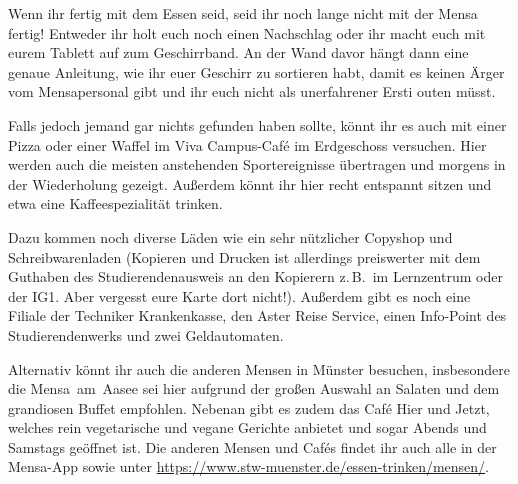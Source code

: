 \begin{multicols}{2}
Wenn ihr fertig mit dem Essen seid, seid ihr noch lange nicht mit der Mensa fertig!
Entweder ihr holt euch noch einen Nachschlag oder ihr macht euch mit eurem Tablett auf zum Geschirrband. An der Wand davor hängt dann eine genaue Anleitung, wie ihr euer Geschirr zu sortieren habt, damit es keinen Ärger vom Mensapersonal gibt und ihr euch nicht als unerfahrener Ersti outen müsst.


Falls jedoch jemand gar nichts gefunden haben sollte, könnt ihr es auch mit einer Pizza oder einer Waffel im Viva Campus-Café im Erdgeschoss versuchen.
Hier werden auch die meisten anstehenden Sportereignisse übertragen und morgens in der Wiederholung gezeigt.
Außerdem könnt ihr hier recht entspannt sitzen und etwa eine Kaffeespezialität trinken.

Dazu kommen noch diverse Läden wie ein sehr nützlicher Copyshop und Schreibwarenladen (Kopieren und Drucken ist allerdings preiswerter mit dem Guthaben des Studierendenausweis an den Kopierern z.\,B.\ im Lernzentrum oder der IG1. Aber vergesst eure Karte dort nicht!). Außerdem gibt es noch eine Filiale der Techniker Krankenkasse, den Aster Reise Service, einen Info-Point des Studierendenwerks und zwei Geldautomaten.

Alternativ könnt ihr auch die anderen Mensen in Münster besuchen, insbesondere die Mensa~am~Aasee sei hier aufgrund der großen Auswahl an Salaten und dem grandiosen Buffet empfohlen. Nebenan gibt es zudem das Café Hier und Jetzt, welches rein vegetarische und vegane Gerichte anbietet und sogar Abends und Samstags geöffnet ist. Die anderen Mensen und Cafés findet ihr auch alle in der Mensa-App sowie unter \url{https://www.stw-muenster.de/essen-trinken/mensen/}.

\end{multicols}

